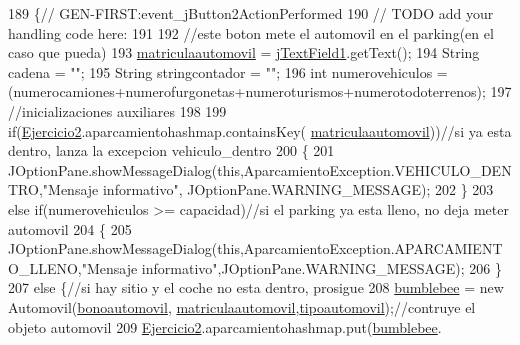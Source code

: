 \begin{DoxyCode}
189                                                                          \{\textcolor{comment}{//
      GEN-FIRST:event\_jButton2ActionPerformed}
190         \textcolor{comment}{// TODO add your handling code here:}
191         
192         \textcolor{comment}{//este boton mete el automovil en el parking(en el caso que pueda)}
193         \mbox{\hyperlink{classejercicio2_1_1_automovil_interfaz_ac2b5205bae6f78acbcc8e55d34cf8e21}{matriculaautomovil}} = \mbox{\hyperlink{classejercicio2_1_1_automovil_interfaz_a3775261058e376ada92aa378228174d1}{jTextField1}}.getText();
194         String cadena = \textcolor{stringliteral}{""};
195         String stringcontador = \textcolor{stringliteral}{""};
196         \textcolor{keywordtype}{int} numerovehiculos = (numerocamiones+numerofurgonetas+numeroturismos+numerotodoterrenos);
197         \textcolor{comment}{//inicializaciones auxiliares}
198         
199         \textcolor{keywordflow}{if}(\mbox{\hyperlink{namespace_ejercicio2}{Ejercicio2}}.aparcamientohashmap.containsKey(
      \mbox{\hyperlink{classejercicio2_1_1_automovil_interfaz_ac2b5205bae6f78acbcc8e55d34cf8e21}{matriculaautomovil}}))\textcolor{comment}{//si ya esta dentro, lanza la excepcion vehiculo\_dentro}
200         \{
201             JOptionPane.showMessageDialog(\textcolor{keyword}{this},AparcamientoException.VEHICULO\_DENTRO,\textcolor{stringliteral}{"Mensaje informativo"},
      JOptionPane.WARNING\_MESSAGE);
202         \}
203         \textcolor{keywordflow}{else} \textcolor{keywordflow}{if}(numerovehiculos >= capacidad)\textcolor{comment}{//si el parking ya esta lleno, no deja meter automovil}
204         \{
205             JOptionPane.showMessageDialog(\textcolor{keyword}{this},AparcamientoException.APARCAMIENTO\_LLENO,\textcolor{stringliteral}{"Mensaje
       informativo"},JOptionPane.WARNING\_MESSAGE);
206         \}
207         \textcolor{keywordflow}{else} \{\textcolor{comment}{//si hay sitio y el coche no esta dentro, prosigue}
208             \mbox{\hyperlink{classejercicio2_1_1_automovil_interfaz_a3ef1155acaf49db6e36883797090f677}{bumblebee}} = \textcolor{keyword}{new} Automovil(\mbox{\hyperlink{classejercicio2_1_1_automovil_interfaz_a3d93aa54c482a013e91c862171f66bac}{bonoautomovil}}, 
      \mbox{\hyperlink{classejercicio2_1_1_automovil_interfaz_ac2b5205bae6f78acbcc8e55d34cf8e21}{matriculaautomovil}},\mbox{\hyperlink{classejercicio2_1_1_automovil_interfaz_ae53ea3336ded07ff47311d4e6d56cdb7}{tipoautomovil}});\textcolor{comment}{//contruye el objeto automovil}
209             \mbox{\hyperlink{namespace_ejercicio2}{Ejercicio2}}.aparcamientohashmap.put(\mbox{\hyperlink{classejercicio2_1_1_automovil_interfaz_a3ef1155acaf49db6e36883797090f677}{bumblebee}}.

\end{DoxyCode}
